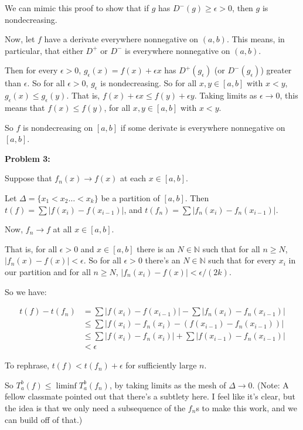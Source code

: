 \documentclass[a4paper,12pt]{article}
\newcommand{\shunt}{\vspace{20mm}}
\newcommand{\absval}[1]{\left\lvert #1 \right\rvert}
\newcommand{\De}{\Delta}
\newcommand{\ep}{\epsilon}
\newcommand{\N}{\mathbb{N}}
\begin{document}
We can mimic this proof to show that if $g$ has $D^-(g) \geq \ep >0$, then $g$ is nondecreasing.

Now, let $f$ have a derivate everywhere nonnegative on $(a,b)$. This means, in particular, that either $D^+$ or $D^-$ is everywhere nonnegative on $(a,b)$.

Then for every $\ep>0$, $g_\ep(x) = f(x) + \ep x$ has $D^+(g_\ep)$ (or $D^-(g_\ep)$) greater than $\ep$. So for all $\ep>0$, $g_\ep$ is nondecreasing. So for all $x,y \in [a,b]$ with $x<y$, $g_\ep(x) \leq g_\ep(y)$. That is, $f(x) + \ep x \leq f(y) + \ep y$. Taking limits as $\ep \to 0$, this means that $f(x) \leq f(y)$, for all $x,y \in [a,b]$ with $x<y$.

So $f$ is nondecreasing on $[a,b]$ if some derivate is everywhere nonnegative on $[a,b]$.

\shunt

{\bf Problem 3:}

Suppose that $f_n(x) \to f(x)$ at each $x \in [a,b]$.

Let $\De = \{x_1 < x_2 \ldots < x_k\}$ be a partition of $[a,b]$. Then $t(f) = \sum \absval{f(x_i)-f(x_{i-1})}$, and  $t(f_n) = \sum \absval{f_n(x_i)-f_n(x_{i-1})}$.

Now, $f_n \to f$ at all $x \in [a,b]$.

That is, for all $\ep >0$ and $x \in [a,b]$ there is an $N \in \N$ such that for all $n \geq N$, $\absval{f_n(x)-f(x)} < \ep$. So for all $\ep>0$ there's an $N \in \N$ such that for every $x_i$ in our partition and for all $n \geq N$, $\absval{f_n(x_i) - f(x)} < \ep/(2k)$. 

So we have:

\begin{align*}
t(f) - t(f_n) &= \sum \absval{f(x_i)-f(x_{i-1})} - \sum \absval{f_n(x_i)-f_n(x_{i-1})} \\
&\leq \sum\absval{f(x_i)-f_n(x_i)-(f(x_{i-1})-f_n(x_{i-1}))} \\
&\leq \sum \absval{f(x_i)-f_n(x_i)} + \sum \absval{f(x_{i-1})-f_n(x_{i-1})}\\
&< \ep
\end{align*}

To rephrase, $t(f) < t(f_n) + \ep$ for sufficiently large $n$.

So $T_a^b(f) \leq \liminf T_a^b(f_n)$, by taking limits as the mesh of $\De \to 0$. (Note: A fellow classmate pointed out that there's a subtlety here. I feel like it's clear, but the idea is that we only need a subsequence of the $f_n$s to make this work, and we can build off of that.)
\end{document}
